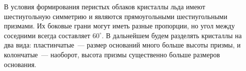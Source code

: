 В условия формирования перистых облаков кристаллы льда имеют шестиугольную симметрию и являются прямоугольными шестиугольными призмами. Их боковые грани могут иметь разные пропорции, но угол между соседними всегда составляет $60^\circ$. В дальнейшем будем разделять кристаллы на два вида: пластинчатые~--- размер оснований много больше высоты призмы, и колончатые~--- наоборот, высота призмы существенно больше размеров основания.








